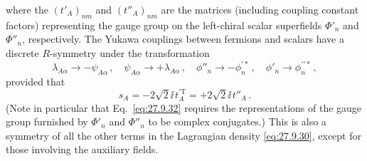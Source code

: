 where the \((t'_A)_{nm}\) and \((t''_A)_{nm}\) are the matrices (including
coupling constant factors) representing the gauge group on the left-chiral
scalar superfields \(\Phi'_n\) and \(\Phi''_n\), respectively. The Yukawa
couplings between fermions and scalars have a discrete \(R\)-symmetry under
the transformation
\begin{equation}
  \lambda_{A\alpha}\longrightarrow-\psi_{A\alpha}\,,
  \quad
  \psi_{A\alpha}\longrightarrow+\lambda_{A\alpha}\,,
  \quad
  \phi''_n\longrightarrow-\phi_n^{\prime *}\,,
  \quad
  \phi'_n\longrightarrow\phi_n^{\prime\prime *}\,,
  \tag{27.9.31}\label{eq:27.9.31}
\end{equation}
provided that
\begin{equation}
  s_A=-2\sqrt{2}\ii\,t_A^{\prime\mathrm T}
  =+2\sqrt{2}\ii\,t''_A\,.
  \tag{27.9.32}\label{eq:27.9.32}
\end{equation}
(Note in particular that Eq.~\eqref{eq:27.9.32} requires the representations
of the gauge group furnished by \(\Phi'_n\) and \(\Phi''_n\) to be complex
conjugates.) This is also a symmetry of all the other terms in the Lagrangian
density \eqref{eq:27.9.30}, except for those involving the auxiliary fields.

